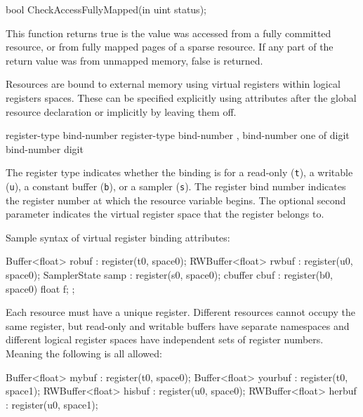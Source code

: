 \begin{HLSL}
  bool CheckAccessFullyMapped(in uint status);
\end{HLSL}

This function returns true is the value was accessed from a fully committed resource,
or from fully mapped pages of a sparse resource.
If any part of the return value was from unmapped memory, false is returned.


Resources are bound to external memory using virtual registers within logical registers spaces.
These can be specified explicitly using attributes after the global resource declaration
or implicitly by leaving them off.

\begin{grammar}
  \br
   register-type bind-number \terminal{)}\br
   register-type bind-number ,  bind-number \terminal{)}\br
   \textnormal{one of}\br
  \br
  \br
  digit\br
  bind-number digit\br
\end{grammar}

The register type indicates whether the binding is for a read-only (\texttt{t}), a writable (\texttt{u}),
a constant buffer (\texttt{b}), or a sampler (\texttt{s}).
The register bind number indicates the register number at which the resource variable begins.
The optional second parameter indicates the virtual register space that the register belongs to.

Sample syntax of virtual register binding attributes:
\begin{HLSL}
  Buffer<float> robuf : register(t0, space0);
  RWBuffer<float> rwbuf : register(u0, space0);
  SamplerState samp : register(s0, space0);
  cbuffer cbuf : register(b0, space0) { float f; };
\end{HLSL}

Each resource must have a unique register. Different resources cannot occupy the same register,
but read-only and writable buffers have separate namespaces and different logical register spaces have independent
sets of register numbers. Meaning the following is all allowed:
\begin{HLSL}
  Buffer<float> mybuf : register(t0, space0);
  Buffer<float> yourbuf : register(t0, space1);
  RWBuffer<float> hisbuf : register(u0, space0);
  RWBuffer<float> herbuf : register(u0, space1);
\end{HLSL}

